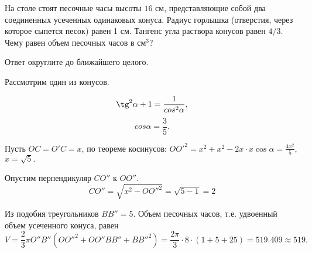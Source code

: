 
На столе стоят песочные часы высоты $16$ см, представляющие собой два соединенных усеченных одинаковых конуса. Радиус горлышка (отверстия, через которое сыпется песок) равен 1 см. Тангенс угла раствора конусов равен $4/3$. Чему равен объем песочных часов в см$^3$? 

Ответ округлите до ближайшего целого.

\solutionSection


Рассмотрим один из конусов.


$$\tg^2\alpha + 1 = \frac{1}{cos^2\alpha},$$
$$cos\alpha = \frac{3}{5}.$$ 

Пусть $OC = O'C = x$, по теореме косинусов: 
$OO'^2 = x^2 + x^2 - 2x\cdot x\cos\alpha = \frac{4x^2}{5},$
$x = \sqrt{5}.$

Опустим перпендикуляр $CO''$ к $OO''$. 
$$CO'' = \sqrt{x^2 - {OO''^2}} = \sqrt{5 - 1} = 2$$ 


Из подобия треугольников $BB'' = 5$. Объем песочных часов, т.е. удвоенный объем усеченного конуса, равен $$V=\frac{2}{3}\pi O''B''(OO''^2 + OO''BB'' + BB''^2)=\frac{2\pi}{3}\cdot 8 \cdot(1 + 5 + 25) = 519.409 \approx 519.$$

